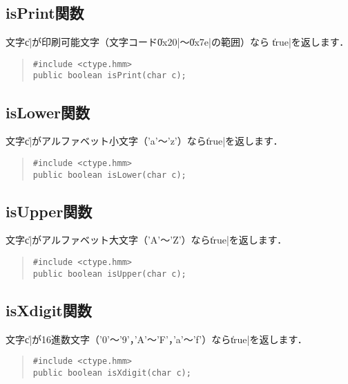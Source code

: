 \subsection{isPrint関数}

文字\|c|が印刷可能文字（文字コード\|0x20|〜\|0x7e|の範囲）なら
\|true|を返します．

\begin{quote}
\begin{verbatim}
#include <ctype.hmm>
public boolean isPrint(char c);
\end{verbatim}
\end{quote}

\subsection{isLower関数}

文字\|c|がアルファベット小文字（'a'〜'z'）なら\|true|を返します．

\begin{quote}
\begin{verbatim}
#include <ctype.hmm>
public boolean isLower(char c);
\end{verbatim}
\end{quote}

\subsection{isUpper関数}

文字\|c|がアルファベット大文字（'A'〜'Z'）なら\|true|を返します．

\begin{quote}
\begin{verbatim}
#include <ctype.hmm>
public boolean isUpper(char c);
\end{verbatim}
\end{quote}

\subsection{isXdigit関数}

文字\|c|が16進数文字（'0'〜'9'，'A'〜'F'，'a'〜'f'）なら\|true|を返します．

\begin{quote}
\begin{verbatim}
#include <ctype.hmm>
public boolean isXdigit(char c);
\end{verbatim}
\end{quote}

